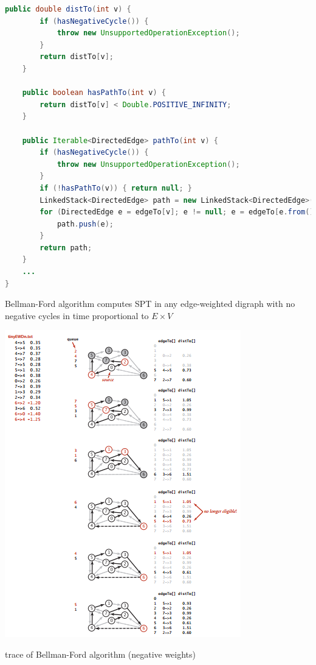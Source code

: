 \documentclass[8pt,a4paper,compress]{beamer}
\begin{document}
\begin{frame}[fragile]
\begin{lstlisting}[language=Java]
    public double distTo(int v) {
        if (hasNegativeCycle()) { 
            throw new UnsupportedOperationException(); 
        }
        return distTo[v];
    }

    public boolean hasPathTo(int v) { 
        return distTo[v] < Double.POSITIVE_INFINITY; 
    }
    
    public Iterable<DirectedEdge> pathTo(int v) {
        if (hasNegativeCycle()) { 
            throw new UnsupportedOperationException(); 
        }
        if (!hasPathTo(v)) { return null; }
        LinkedStack<DirectedEdge> path = new LinkedStack<DirectedEdge>();
        for (DirectedEdge e = edgeTo[v]; e != null; e = edgeTo[e.from()]) {
            path.push(e);
        }
        return path;
    }
    ...
}
\end{lstlisting}

\bigskip

Bellman-Ford algorithm computes SPT in any edge-weighted digraph with no negative cycles in time proportional to $E \times V$
\end{frame}

\begin{frame}[fragile]
\begin{center}

\includegraphics[scale=0.42]{./figures/sp6.png}

\smallskip

\small trace of Bellman-Ford algorithm (negative weights)
\end{center}
\end{frame}
\end{document}
